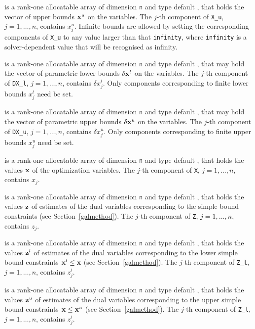 \documentclass{galahad}
\begin{document}
\begin{description}
 is a rank-one allocatable array of dimension {\tt n} and type 
default \realdp, that holds
the vector of upper bounds ${\mathbf{x}}^{u}$ on the variables.
The $j$-th component of {\tt X\_u}, $j = 1, \ldots , n$, 
contains $x_{j}^{u}$.
Infinite bounds are allowed by setting the corresponding 
components of {\tt X\_u} to any value larger than that {\tt infinity}, 
where {\tt infinity} is a  solver-dependent value that will be recognised as
infinity.

 is a rank-one allocatable array of dimension {\tt n} and type 
default \realdp, that may hold the vector of parametric lower bounds 
$\delta {\mathbf{x}}^{l}$ on the variables. The $j$-th component of 
{\tt DX\_l}, $j = 1, \ldots , n$, contains $\delta x_{j}^{l}$.
Only components corresponding to finite lower bounds $x_{j}^{l}$
need be set.

 is a rank-one allocatable array of dimension {\tt n} and type 
default \realdp, that may hold the vector of parametric upper bounds 
$\delta {\mathbf{x}}^{u}$  on the variables. The $j$-th component of 
{\tt DX\_u}, $j = 1,  \ldots ,  n$, contains $\delta x_{j}^{u}$.
Only components corresponding to finite upper bounds $x_{j}^{u}$
need be set.

 is a rank-one allocatable array of dimension {\tt n} and type 
default \realdp, 
that holds the values ${\mathbf{x}}$ of the optimization variables.
The $j$-th component of {\tt X}, $j = 1,  \ldots , n$, contains $x_{j}$.  

 is a rank-one allocatable array of dimension {\tt n} and type default 
\realdp, that holds
the values ${\mathbf{z}}$ of estimates  of the dual variables 
corresponding to the simple bound constraints (see Section~\ref{galmethod}).
The $j$-th component of {\tt Z}, $j = 1,  \ldots ,  n$, contains $z_{j}$.  

 is a rank-one allocatable array of dimension {\tt n} and type default 
\realdp, that holds
the values ${\mathbf{z}}^{l}$ of estimates  of the dual variables 
corresponding to the lower simple bound constraints ${\mathbf{x}}^{l} \leq {\mathbf{x}}$
(see Section~\ref{galmethod}).
The $j$-th component of {\tt Z\_l}, $j = 1,  \ldots ,  n$, 
contains $z_{j}^{l}$.  

 is a rank-one allocatable array of dimension {\tt n} and type default 
\realdp, that holds
the values ${\mathbf{z}}^{u}$ of estimates  of the dual variables 
corresponding to the upper simple bound constraints ${\mathbf{x}} \leq {\mathbf{x}}^{u}$
(see Section~\ref{galmethod}).
The $j$-th component of {\tt Z\_l}, $j = 1,  \ldots ,  n$, 
contains $z_{j}^{l}$.  


\end{description}
\end{document}
